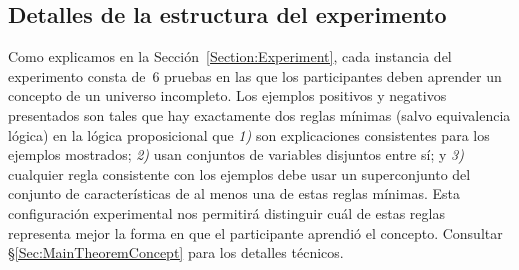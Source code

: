 \subsection{Detalles de la estructura del experimento} \label{FullExperimentDescription} 

Como explicamos en la Sección~\ref{Section:Experiment}, cada instancia del experimento consta de~6 pruebas en las que los participantes deben aprender un concepto de un universo incompleto. Los ejemplos positivos y negativos presentados son tales que hay exactamente dos reglas mínimas (salvo equivalencia lógica) en la lógica proposicional que {\em 1)} son explicaciones consistentes para los ejemplos mostrados; {\em 2)} usan conjuntos de variables disjuntos entre sí; y {\em 3)} cualquier regla consistente con los ejemplos debe usar un superconjunto del conjunto de características de al menos una de estas reglas mínimas. Esta configuración experimental nos permitirá distinguir cuál de estas reglas representa mejor la forma en que el participante aprendió el concepto. Consultar \S\ref{Sec:MainTheoremConcept} para los detalles técnicos.


